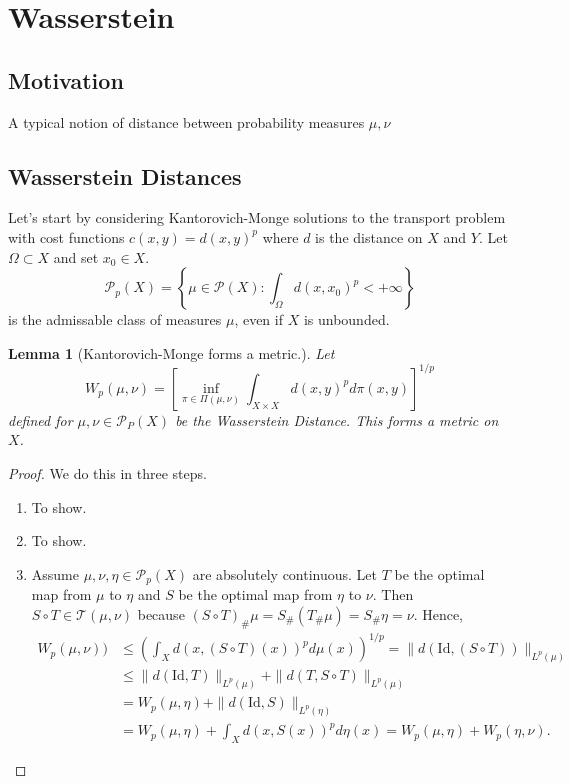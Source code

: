 \documentclass[12pt]{article}
\theoremstyle{plain}
\newtheorem{lem}{Lemma}[section]
\numberwithin{equation}{section}
\begin{document}
\section{Wasserstein}
\subsection{Motivation}
A typical notion of distance between probability measures $\mu,\nu$ 
\subsection{Wasserstein Distances}
Let's start by considering Kantorovich-Monge solutions to the transport problem with cost functions $c(x,y) = d(x,y)^p$ where $d$ is the distance on $X$ and $Y$.
Let $\Omega\subset X$ and set $x_0\in X$.
\[\mathcal{P}_p(X) = \left\{\mu\in\mathcal{P}(X):\int_{\Omega}d(x,x_0)^p < +\infty\right\}\]
is the admissable class of measures $\mu$, even if $X$ is unbounded.
\begin{lem}[Kantorovich-Monge forms a metric.]\label{lem:wass}
	Let \[W_p(\mu,\nu) = \left[\inf_{\pi\in\Pi(\mu,\nu)}\int_{X\times X}d(x,y)^pd\pi(x,y)\right]^{1/p}\] defined for $\mu,\nu\in\mathcal{P}_P(X)$ be the Wasserstein Distance. This forms a metric on $X$.
\end{lem}
\begin{proof}
  We do this in three steps.
  \begin{enumerate}
    \item To show.
    \item To show.
    \item   Assume $\mu,\nu,\eta\in \mathcal{P}_p(X)$ are absolutely continuous. Let $T$ be the optimal map from $\mu$ to $\eta$ and $S$ be the optimal map from $\eta$ to $\nu$.
    Then $S\circ T\in \mathcal{T}(\mu,\nu)$ because $(S\circ T)_\#\mu = S_\#(T_\#\mu) = S_\#\eta = \nu$. Hence,
    \begin{align*}
      W_p(\mu,\nu)) &\le \left(\int_Xd(x,(S\circ T)(x))^pd\mu(x)\right)^{1/p} = \|d(\text{Id},(S\circ T))\|_{L^p(\mu)} \\
      &\le \|d(\text{Id},T)\|_{L^p(\mu)} + \|d(T, S\circ T)\|_{L^p(\mu)} \\
      &= W_p(\mu,\eta) + \|d(\text{Id}, S)\|_{L^p(\eta)} \\
      &= W_p(\mu,\eta) + \int_{X}d(x,S(x))^pd\eta(x) = W_p(\mu,\eta) + W_p(\eta,\nu).
      \end{align*}
  \end{enumerate}

\end{proof}
\end{document}
